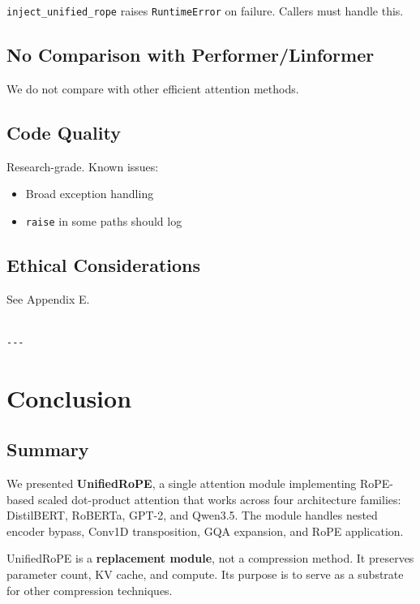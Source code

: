 \texttt{inject\_unified\_rope} raises \texttt{RuntimeError} on failure. Callers must 
handle this.

\subsection{No Comparison with Performer/Linformer}

We do not compare with other efficient attention methods.

\subsection{Code Quality}

Research-grade. Known issues:
\begin{itemize}
\item Broad exception handling
\item \texttt{raise} in some paths should log

\end{itemize}
\subsection{Ethical Considerations}

See Appendix E.
\begin{lstlisting}

---
\end{lstlisting}


\section{Conclusion}

\subsection{Summary}

We presented \textbf{UnifiedRoPE}, a single attention module implementing RoPE-based 
scaled dot-product attention that works across four architecture families: 
DistilBERT, RoBERTa, GPT-2, and Qwen3.5. The module handles nested encoder 
bypass, Conv1D transposition, GQA expansion, and RoPE application.

UnifiedRoPE is a \textbf{replacement module}, not a compression method. It 
preserves parameter count, KV cache, and compute. Its purpose is to serve 
as a substrate for other compression techniques.

